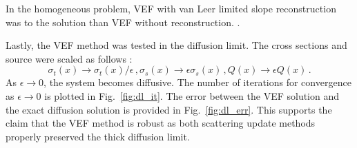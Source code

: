 In the homogeneous problem, VEF with van Leer limited slope reconstruction was  to the \SN solution than VEF without reconstruction. . 

Lastly, the VEF method was tested in the diffusion limit. The cross sections and source were scaled as follows \cite{diflim}: 
	\begin{subequations} \label{res:scaling}
		\begin{equation} 
			\sigma_t(x) \rightarrow \sigma_t(x)/\epsilon \,, 
		\end{equation}
		\begin{equation}
			\sigma_s(x) \rightarrow \epsilon \sigma_s(x) \,,
		\end{equation}
		\begin{equation}
			Q(x) \rightarrow \epsilon Q(x) \,. 
		\end{equation}
	\end{subequations}
As $\epsilon \rightarrow 0$, the system becomes diffusive. The number of iterations for convergence as $\epsilon \rightarrow 0$ is plotted in Fig.~\ref{fig:dl_it}. The error between the VEF solution and the exact diffusion solution is provided in Fig.~\ref{fig:dl_err}. This supports the claim that the VEF method is robust as both scattering update methods properly preserved the thick diffusion limit. 
	
